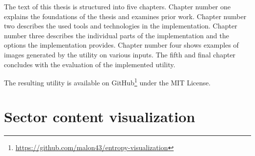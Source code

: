 \documentclass[
  digital, %
  color,   %
  oneside, %
  lof,     %
  nolot,     %
]{fithesis4}
\begin{document}
The text of this thesis is structured into five chapters.
Chapter number one explains the foundations of the thesis and examines prior work.
Chapter number two describes the used tools and technologies in the implementation.
Chapter number three describes the individual parts of the implementation and the options the implementation provides.
Chapter number four shows examples of images generated by the utility on various inputs.
The fifth and final chapter concludes with the evaluation of the implemented utility.

The resulting utility is available on GitHub\footnote{\url{https://github.com/malon43/entropy-visualization}} under the MIT License.





\chapter{Sector content visualization}
\label{chap:sector-content-visualization}
\end{document}
